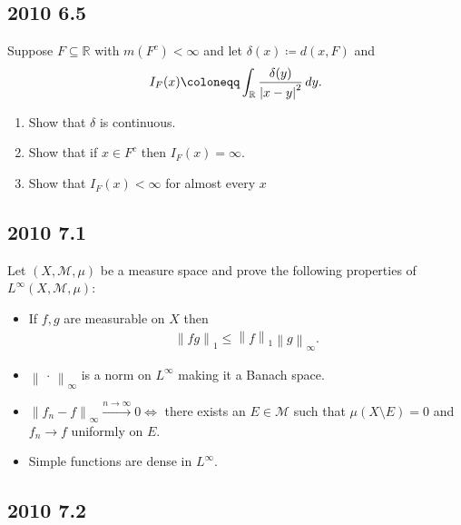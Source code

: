 \hypertarget{section-5}{%
\subsection{2010 6.5}\label{section-5}}

Suppose \(F \subseteq {\mathbb{R}}\) with \(m(F^c) < \infty\) and let
\(\delta(x) \coloneqq d(x, F)\) and
\begin{align*}
I_F(x) \coloneqq\int_{\mathbb{R}}{ \delta(y) \over {\left\lvert {x-y} \right\rvert}^2 } \,dy
.\end{align*}

\begin{enumerate}
\def\labelenumi{\alph{enumi}.}
\item
  Show that \(\delta\) is continuous.
\item
  Show that if \(x\in F^c\) then \(I_F(x) = \infty\).
\item
  Show that \(I_F(x) < \infty\) for almost every \(x\)
\end{enumerate}

\hypertarget{section-6}{%
\subsection{2010 7.1}\label{section-6}}

Let \((X, \mathcal{M}, \mu)\) be a measure space and prove the following
properties of \(L^ \infty (X, \mathcal{M}, \mu)\):

\begin{itemize}
\item
  If \(f, g\) are measurable on \(X\) then
  \begin{align*}
  {\left\lVert {fg} \right\rVert}_1 \leq {\left\lVert {f} \right\rVert}_1 {\left\lVert {g} \right\rVert}_{\infty }
  .\end{align*}
\item
  \({\left\lVert {{\,\cdot\,}} \right\rVert}_{\infty }\) is a norm on
  \(L^{\infty }\) making it a Banach space.
\item
  \({\left\lVert {f_n - f} \right\rVert}_{\infty } \overset{n\to \infty }\to 0 \iff\)
  there exists an \(E\in \mathcal{M}\) such that
  \(\mu(X\setminus E) = 0\) and \(f_n \to f\) uniformly on \(E\).
\item
  Simple functions are dense in \(L^{\infty }\).
\end{itemize}

\hypertarget{section-7}{%
\subsection{2010 7.2}\label{section-7}}

